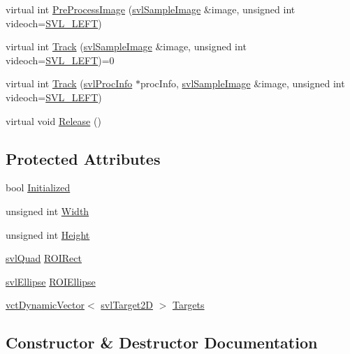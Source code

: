 \begin{DoxyCompactItemize}
virtual int \hyperlink{classsvl_image_tracker_a817d28eaf0a20c73273e7c9060c03ebf}{Pre\+Process\+Image} (\hyperlink{classsvl_sample_image}{svl\+Sample\+Image} \&image, unsigned int videoch=\hyperlink{svl_definitions_8h_ab9fec7615f19c8df2919eebcab0b187f}{S\+V\+L\+\_\+\+L\+E\+F\+T})
\item 
virtual int \hyperlink{classsvl_image_tracker_aa806fe1fe56828124a85cb81e0d7bd7f}{Track} (\hyperlink{classsvl_sample_image}{svl\+Sample\+Image} \&image, unsigned int videoch=\hyperlink{svl_definitions_8h_ab9fec7615f19c8df2919eebcab0b187f}{S\+V\+L\+\_\+\+L\+E\+F\+T})=0
\item 
virtual int \hyperlink{classsvl_image_tracker_af1307ba743f3b10c5596a2307dd7217c}{Track} (\hyperlink{structsvl_proc_info}{svl\+Proc\+Info} $\ast$proc\+Info, \hyperlink{classsvl_sample_image}{svl\+Sample\+Image} \&image, unsigned int videoch=\hyperlink{svl_definitions_8h_ab9fec7615f19c8df2919eebcab0b187f}{S\+V\+L\+\_\+\+L\+E\+F\+T})
\item 
virtual void \hyperlink{classsvl_image_tracker_a08ca47278e9d55b83f081c10e1159340}{Release} ()
\end{DoxyCompactItemize}
\subsection*{Protected Attributes}
\begin{DoxyCompactItemize}
\item 
bool \hyperlink{classsvl_image_tracker_ad5478f0908bc03e76fb876e43aa1deae}{Initialized}
\item 
unsigned int \hyperlink{classsvl_image_tracker_a6bad5bd6edbd63f8a350203afe26dea6}{Width}
\item 
unsigned int \hyperlink{classsvl_image_tracker_a0ff4ce15e78b8699cb891123daaa7231}{Height}
\item 
\hyperlink{structsvl_quad}{svl\+Quad} \hyperlink{classsvl_image_tracker_a89ce7f905564fec40407e77aa898e465}{R\+O\+I\+Rect}
\item 
\hyperlink{structsvl_ellipse}{svl\+Ellipse} \hyperlink{classsvl_image_tracker_aedd5673ace2aef2c64c0e0b5a52f7e14}{R\+O\+I\+Ellipse}
\item 
\hyperlink{classvct_dynamic_vector}{vct\+Dynamic\+Vector}$<$ \hyperlink{structsvl_target2_d}{svl\+Target2\+D} $>$ \hyperlink{classsvl_image_tracker_acc589d98d13de77df8a2eed855df9d28}{Targets}
\end{DoxyCompactItemize}


\subsection{Constructor \& Destructor Documentation}
\hypertarget{classsvl_image_tracker_ab130e149fbc53c12361f616549f84c46}{}
